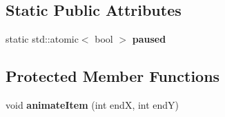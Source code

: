 \subsection*{Static Public Attributes}
\begin{DoxyCompactItemize}
\item 
\mbox{\label{class_p_c_thread_acee1e97e483e422b8845704f1fa3f793}} 
static std\+::atomic$<$ bool $>$ {\bfseries paused}
\end{DoxyCompactItemize}
\subsection*{Protected Member Functions}
\begin{DoxyCompactItemize}
\item 
\mbox{\label{class_p_c_thread_a82130f5a7e30132226be3f9966b1e526}} 
void {\bfseries animate\+Item} (int endX, int endY)
\end{DoxyCompactItemize}
